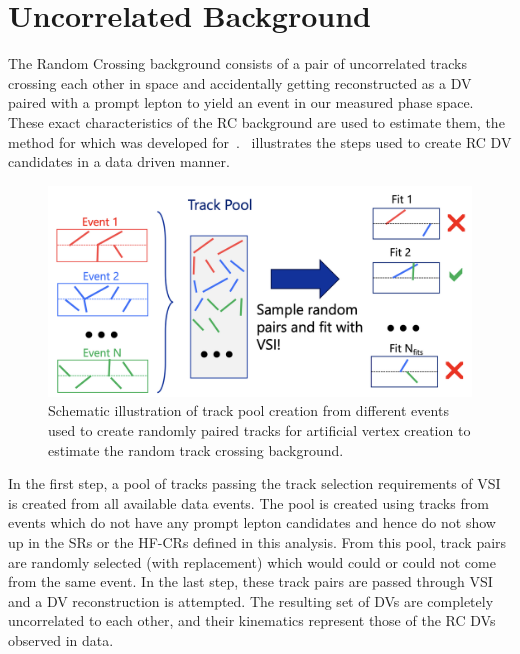 \section{Uncorrelated Background}\label{sec:uncorr_bkg}
The Random Crossing background consists of a pair of uncorrelated tracks crossing each other in space and accidentally getting reconstructed as a DV paired with a prompt lepton to yield an event in our measured phase space. These exact characteristics of the RC background are used to estimate them, the method for which was developed for~\cite{Barlow:1749971}.~ illustrates the steps used to create RC DV candidates in a data driven manner.

\begin{figure}[!ht]
    \centering
    \includegraphics[width=\textwidth]{figures/analysis_strategy/random_crossing/rtc_scheme.png}
    \caption{Schematic illustration of track pool creation from different events used to create randomly paired tracks for artificial vertex creation to estimate the random track crossing background.}
    \label{fig:rc_method}
\end{figure}

In the first step, a pool of tracks passing the track selection requirements of VSI is created from all available data events. The pool is created using tracks from events which do not have any prompt lepton candidates and hence do not show up in the SRs or the HF-CRs defined in this analysis. From this pool, track pairs are randomly selected (with replacement) which would could or could not come from the same event. In the last step, these track pairs are passed through VSI and a DV reconstruction is attempted. The resulting set of DVs are completely uncorrelated to each other, and their kinematics represent those of the RC DVs observed in data.

